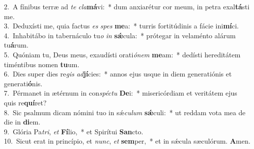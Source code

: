 {2.~}A fínibus terræ ad \textit{te} \textit{cla}\textbf{má}vi:~* dum anxiarétur cor meum, in petra exal\textbf{tá}sti me.\\
{3.~}Deduxísti me, quia factus \textit{es} \textit{spes} \textbf{me}a:~* turris fortitúdinis a fácie ini\textbf{mí}ci.\\
{4.~}Inhabitábo in tabernáculo tu\textit{o} \textit{in} \textbf{sǽ}cula:~* prótegar in velaménto alárum tu\textbf{á}rum.\\
{5.~}Quóniam tu, Deus meus, exaudísti orati\textit{ó}\textit{nem} \textbf{me}am:~* dedísti hereditátem timéntibus nomen \textbf{tu}um.\\
{6.~}Dies super dies re\textit{gis} \textit{ad}\textbf{jí}cies:~* annos ejus usque in diem generatiónis et generati\textbf{ó}nis.\\
{7.~}Pérmanet in ætérnum in con\textit{spé}\textit{ctu} \textbf{De}i:~* misericórdiam et veritátem ejus quis re\textbf{quí}ret?\\
{8.~}Sic psalmum dicam nómini tuo in sǽ\textit{cu}\textit{lum} \textbf{sǽ}culi:~* ut reddam vota mea de die in \textbf{di}em.\\
{9.~}Glória Pa\textit{tri}, \textit{et} \textbf{Fí}lio,~* et Spirítui \textbf{San}cto.\\
{10.~}Sicut erat in princípio, et \textit{nunc}, \textit{et} \textbf{sem}per,~* et in sǽcula sæculórum. \textbf{A}men.\\
